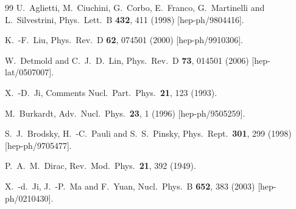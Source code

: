 \documentclass[aps,prd,preprint,tightenlines,superscriptaddress]{revtex4}
\begin{document}
\begin{thebibliography}{99}
  U.~Aglietti, M.~Ciuchini, G.~Corbo, E.~Franco, G.~Martinelli and L.~Silvestrini,
  Phys.\ Lett.\ B {\bf 432}, 411 (1998)
  [hep-ph/9804416].


  K.~-F.~Liu,
  Phys.\ Rev.\ D {\bf 62}, 074501 (2000)
  [hep-ph/9910306].

  W.~Detmold and C.~J.~D.~Lin,
  Phys.\ Rev.\ D {\bf 73}, 014501 (2006)
  [hep-lat/0507007].



  X.~-D.~Ji,
  Comments Nucl.\ Part.\ Phys.\  {\bf 21}, 123 (1993).

  M.~Burkardt,
  Adv.\ Nucl.\ Phys.\  {\bf 23}, 1 (1996)
  [hep-ph/9505259].

  S.~J.~Brodsky, H.~-C.~Pauli and S.~S.~Pinsky,
  Phys.\ Rept.\  {\bf 301}, 299 (1998)
  [hep-ph/9705477].


  P.~A.~M.~Dirac,
  Rev.\ Mod.\ Phys.\  {\bf 21}, 392 (1949).


  X.~-d.~Ji, J.~-P.~Ma and F.~Yuan,
  Nucl.\ Phys.\ B {\bf 652}, 383 (2003)
  [hep-ph/0210430].


\end{thebibliography}
\end{document}
